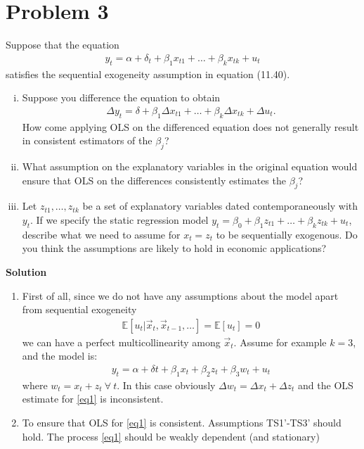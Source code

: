 \documentclass[a4paper]{article}
\newcommand{\expect}{\mathbb{E}}
\begin{document}
\section*{Problem 3}
Suppose that the equation 
\begin{align*}
y_t = \alpha + \delta _t + \beta_1 x_{t1}+\dots+\beta_k x_{tk}+u_t
\end{align*} satisfies the sequential exogeneity assumption in equation (11.40). 
\begin{enumerate}[(i)]
\item Suppose you difference the equation to obtain 
\begin{align}\label{eq1}
\Delta y_t = \delta +\beta_1 \Delta x_{t1} + \dots+ \beta_k \Delta x_{tk} + \Delta u_t.
\end{align}
How come applying OLS on the differenced equation does not generally result in consistent estimators of the $\beta_j$?
\item What assumption on the explanatory variables in the original equation would ensure that OLS on the differences consistently estimates the $\beta_j$?
\item Let $z_{t1},\dots, z_{tk}$ be a set of explanatory variables dated contemporaneously with $y_t$. If we specify the static regression model $y_t = \beta_0 + \beta_1z_{t1} +\dots+ \beta_k z_{tk} + u_t$, describe what we need to assume for $x_t = z_t$ to be sequentially exogenous. Do you think the assumptions are likely to hold in economic applications?
\end{enumerate}

\textbf{Solution}

\begin{enumerate}
	\item First of all, since we do not have any assumptions about the model apart from sequential exogeneity
	\begin{align*}
	\expect[u_t|\vec{x}_t, \vec{x}_{t-1}, \dots] = \expect[u_t] = 0
	\end{align*}
	we can have a perfect multicollinearity among $\vec{x}_t$. Assume for example $k = 3$, and the model is:
	\begin{align*}
	y_t =\alpha + \delta t + \beta_1 x_t + \beta_2 z_t + \beta_3 w_t + u_t
	\end{align*} 
	where $w_t = x_t + z_t\ \forall\ t$. In this case obviously $\Delta w_t = \Delta x_t + \Delta z_t$ and the OLS estimate for \eqref{eq1} is inconsistent.
	\item To ensure that OLS for \eqref{eq1} is consistent. Assumptions TS1'-TS3' should hold. The process \eqref{eq1} should be weakly dependent (and stationary)
\end{enumerate}
\end{document}
